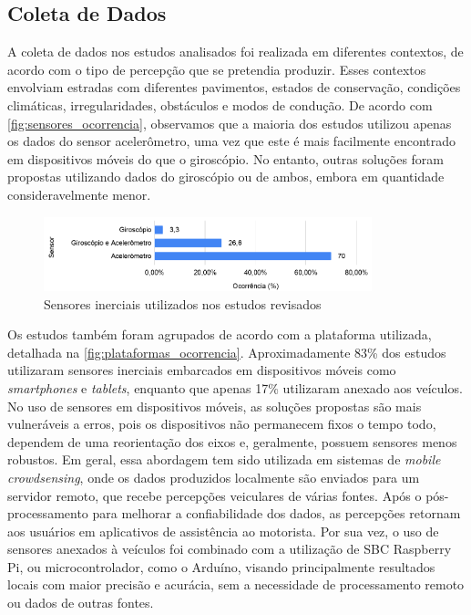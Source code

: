 \subsection{Coleta de Dados}

A coleta de dados nos estudos analisados foi realizada em diferentes contextos, de acordo com o tipo de percepção que se pretendia produzir. Esses contextos envolviam estradas com diferentes pavimentos, estados de conservação, condições climáticas, irregularidades, obstáculos e modos de condução. De acordo com \autoref{fig:sensores_ocorrencia}, observamos que a maioria dos estudos utilizou apenas os dados do sensor acelerômetro, uma vez que este é mais facilmente encontrado em dispositivos móveis do que o giroscópio. No entanto, outras soluções foram propostas utilizando dados do giroscópio ou de ambos, embora em quantidade consideravelmente menor.

\begin{figure}[h!]
  \centering
  \caption{Sensores inerciais utilizados nos estudos revisados}
   \label{fig:sensores_ocorrencia}
   \includegraphics[width=0.85\textwidth]{figuras/fig_14.png}
\end{figure}

Os estudos também foram agrupados de acordo com a plataforma utilizada, detalhada na \autoref{fig:plataformas_ocorrencia}. Aproximadamente 83\% dos estudos utilizaram sensores inerciais embarcados em dispositivos móveis como \textit{smartphones} e \textit{tablets}, enquanto que apenas 17\% utilizaram anexado aos veículos. No uso de sensores em dispositivos móveis, as soluções propostas são mais vulneráveis a erros, pois os dispositivos não permanecem fixos o tempo todo, dependem de uma reorientação dos eixos e, geralmente, possuem sensores menos robustos. Em geral, essa abordagem tem sido utilizada em sistemas de \textit{mobile crowdsensing}, onde os dados produzidos localmente são enviados para um servidor remoto, que recebe percepções veiculares de várias fontes. Após o pós-processamento para melhorar a confiabilidade dos dados, as percepções retornam aos usuários em aplicativos de assistência ao motorista. Por sua vez, o uso de sensores anexados à veículos foi combinado com a utilização de SBC Raspberry Pi, ou microcontrolador, como o Arduíno, visando principalmente resultados locais com maior precisão e acurácia, sem a necessidade de processamento remoto ou dados de outras fontes.

